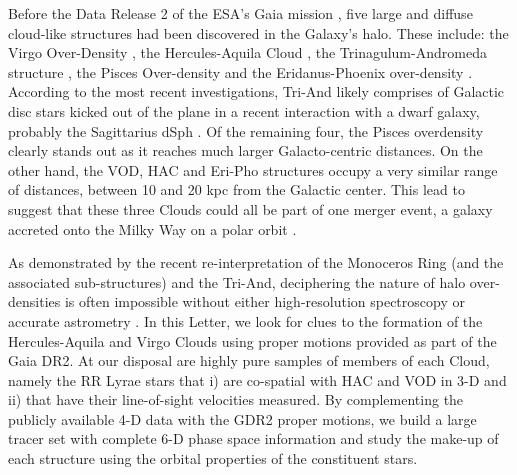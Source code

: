 \documentclass[fleqn,usenatbib]{mnras}
\begin{document}
Before the Data Release 2 \citep[][]{Brown2018} of the ESA's Gaia
mission \citep[][]{Prusti2016}, five large and diffuse cloud-like
structures had been discovered in the Galaxy's halo. These include:
the Virgo Over-Density
\citep[VOD,][]{Vivas2001,Newberg2002,Duffau2006,Juric2008,Bonaca2012},
the Hercules-Aquila Cloud \citep[HAC,][]{Be07,Simion2014}, the
Trinagulum-Andromeda structure
\citep[Tri-And,][]{Rocha2004,Majewski2004,Deason2014}, the Pisces
Over-density \citep[][]{Sesar2007,Wa09,Nie2015} and the
Eridanus-Phoenix over-density \citep[Eri-Pho,][]{Li2016}. According to
the most recent investigations, Tri-And likely comprises of Galactic
disc stars kicked out of the plane in a recent interaction with a
dwarf galaxy, probably the Sagittarius dSph
\citep[e.g.][]{Pr15,Bergemann2018,Hayes2018}. Of the remaining four,
the Pisces overdensity clearly stands out as it reaches much larger
Galacto-centric distances. On the other hand, the VOD, HAC and Eri-Pho
structures occupy a very similar range of distances, between 10 and 20
kpc from the Galactic center. This lead \citet{Li2016} to suggest that
these three Clouds could all be part of one merger event, a galaxy
accreted onto the Milky Way on a polar orbit \citep[see
  also][]{Juric2008}.
  
As demonstrated by the recent re-interpretation of the Monoceros Ring
(and the associated sub-structures) and the Tri-And, deciphering the
nature of halo over-densities is often impossible without either
high-resolution spectroscopy \citep[e.g.][]{Bergemann2018} or accurate
astrometry \citep[e.g.][]{deBoer2018,Deason2018}. In this Letter, we
look for clues to the formation of the Hercules-Aquila and Virgo
Clouds using proper motions provided as part of the Gaia DR2. At our
disposal are highly pure samples of members of each Cloud, namely the
RR Lyrae stars that i) are co-spatial with HAC and VOD in 3-D and ii)
that have their line-of-sight velocities measured. By complementing
the publicly available 4-D data with the GDR2 proper motions, we build
a large tracer set with complete 6-D phase space information and study
the make-up of each structure using the orbital properties of the
constituent stars.
\end{document}
